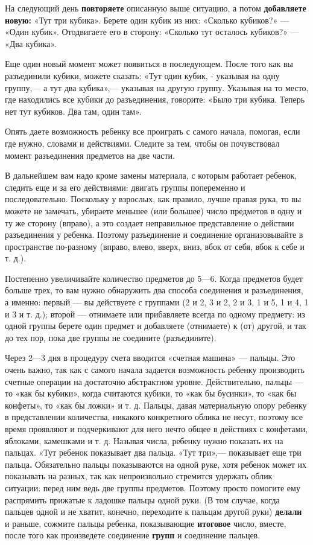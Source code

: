 \documentclass{book}
\begin{document}
На следующий день \textbf{повторяете} описанную выше ситуацию, а потом
\textbf{добавляете новую:} «Тут три кубика». Берете один кубик из них:
«Сколько кубиков?» --- «Один кубик». Отодвигаете его в сторону: «Сколько
тут осталось кубиков?» --- «Два кубика».

Еще один новый момент может появиться в последующем. После того как вы
разъединили кубики, можете сказать: «Тут один кубик, - указывая на одну
группу,--- а тут два кубика»,--- указывая на другую группу. Указывая на
то место, где находились все кубики до разъединения, говорите: «Было три
кубика. Теперь нет тут кубиков. Два там, один там».

Опять даете возможность ребенку все проиграть с самого начала, помогая,
если где нужно, словами и действиями. Следите за тем, чтобы он
почувствовал момент разъединения предметов на две части.

В дальнейшем вам надо кроме замены материала, с которым работает
ребенок, следить еще и за его действиями: двигать группы попеременно и
последовательно. Поскольку у взрослых, как правило, лучше правая рука,
то вы можете не замечать, убираете меньшее (или большее) число предметов
в одну и ту же сторону (вправо), а это создает неправильное
представление о действии разъединения у ребенка. Поэтому разъединение и
соединение организовывайте в пространстве по-разному (вправо, влево,
вверх, вниз, вбок от себя, вбок к себе и т. д.).

Постепенно увеличивайте количество предметов до 5---6. Когда предметов
будет больше трех, то вам нужно обнаружить два способа соединения и
разъединения, а именно: первый --- вы действуете с группами (2 и 2, 3 и
2, 2 и 3, 1 и 5, 1 и 4, 1 и 3 и т. д.); второй --- отнимаете или
прибавляете всегда по одному предмету: из одной группы берете один
предмет и добавляете (отнимаете) к (от) другой, и так до тех пор, пока
две группы не соедините (разъедините).

Через 2---3 дня в процедуру счета вводится «счетная машина» --- пальцы.
Это очень важно, так как с самого начала задается возможность ребенку
производить счетные операции на достаточно абстрактном уровне.
Действительно, пальцы --- то «как бы кубики», когда считаются кубики, то
«как бы бусинки», то «как бы конфеты», то «как бы ложки» и т. д. Пальцы,
давая материальную опору ребенку в представлении количества, никакого
конкретного облика не несут, поэтому все время проявляют и подчеркивают
для него нечто общее в действиях с конфетами, яблоками, камешками и т.
д. Называя числа, ребенку нужно показать их на пальцах. «Тут ребенок
показывает два пальца. «Тут три»,--- показывает еще три пальца\textbf{.}
Обязательно пальцы показываются на одной руке, хотя ребенок может их
показывать на разных, так как непроизвольно стремится удержать облик
ситуации: перед ним ведь две группы предметов. Поэтому просто помогите
ему распрямить прижатые к ладошке пальцы одной руки. (В том случае,
когда пальцев одной и не хватит, конечно, переходите к пальцам другой
руки) \textbf{делали} и раньше, сожмите пальцы ребенка, показывающие
\textbf{итоговое} число, вместе, после того как произведете соединение
\textbf{групп} и соединение пальцев.
\end{document}
